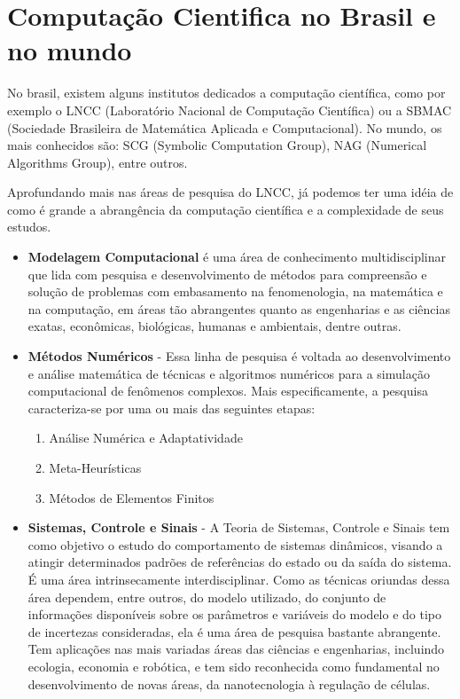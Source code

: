 \section{Computação Cientifica no Brasil e no mundo}

No brasil, existem alguns institutos dedicados a computação científica, como por
exemplo o LNCC (Laboratório Nacional de Computação Científica) ou a SBMAC
(Sociedade Brasileira de Matemática Aplicada e Computacional). No mundo, os mais
conhecidos são: SCG (Symbolic Computation Group), NAG (Numerical Algorithms
Group), entre outros.

Aprofundando mais nas áreas de pesquisa do LNCC, já podemos ter uma idéia de
como é grande a abrangência da computação científica e a complexidade de seus
estudos.

\begin{itemize}

	\item \textbf{Modelagem Computacional} é uma área de conhecimento
		multidisciplinar que lida com pesquisa e desenvolvimento de métodos para
		compreensão e solução de problemas com embasamento na fenomenologia, na
		matemática e na computação, em áreas tão abrangentes quanto as
		engenharias e as ciências exatas, econômicas, biológicas, humanas e
		ambientais, dentre outras.

	\item \textbf{Métodos Numéricos} - Essa linha de pesquisa é voltada ao
		desenvolvimento e análise matemática de técnicas e algoritmos numéricos
		para a simulação computacional de fenômenos complexos.  Mais
		especificamente, a pesquisa caracteriza-se por uma ou mais das seguintes
		etapas:
		\begin{enumerate}

			\item Análise Numérica e Adaptatividade

			\item Meta-Heurísticas

			\item Métodos de Elementos Finitos

		\end{enumerate}

	\item \textbf{Sistemas, Controle e Sinais} - A Teoria de Sistemas, Controle
		e Sinais tem como objetivo o estudo do comportamento de sistemas
		dinâmicos, visando a atingir determinados padrões de referências do
		estado ou da saída do sistema. É uma área intrinsecamente
		interdisciplinar. Como as técnicas oriundas dessa área dependem, entre
		outros, do modelo utilizado, do conjunto de informações disponíveis
		sobre os parâmetros e variáveis do modelo e do tipo de incertezas
		consideradas, ela é uma área de pesquisa bastante abrangente.  Tem
		aplicações nas mais variadas áreas das ciências e engenharias, incluindo
		ecologia, economia e robótica, e tem sido reconhecida como fundamental
		no desenvolvimento de novas áreas, da nanotecnologia à regulação de
		células.


\end{itemize}
